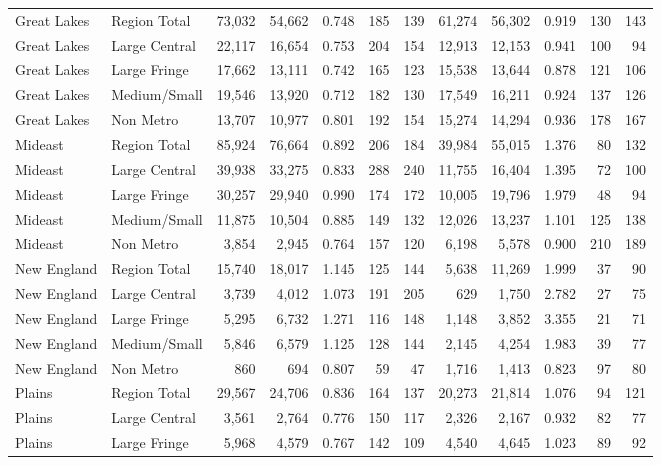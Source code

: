 \documentclass[
]{article}
\begin{document}
\begin{table}
\begin{tabular}[t]{llrrrrrrrrrr}
\addlinespace[5pt]
Great Lakes & Region Total & 73,032 & 54,662 & 0.748 & 185 & 139 & 61,274 & 56,302 & 0.919 & 130 & 143\\
\addlinespace[2pt]
Great Lakes & Large Central & 22,117 & 16,654 & 0.753 & 204 & 154 & 12,913 & 12,153 & 0.941 & 100 & 94\\
Great Lakes & Large Fringe & 17,662 & 13,111 & 0.742 & 165 & 123 & 15,538 & 13,644 & 0.878 & 121 & 106\\
Great Lakes & Medium/Small & 19,546 & 13,920 & 0.712 & 182 & 130 & 17,549 & 16,211 & 0.924 & 137 & 126\\
Great Lakes & Non Metro & 13,707 & 10,977 & 0.801 & 192 & 154 & 15,274 & 14,294 & 0.936 & 178 & 167\\
\addlinespace[5pt]
Mideast & Region Total & 85,924 & 76,664 & 0.892 & 206 & 184 & 39,984 & 55,015 & 1.376 & 80 & 132\\
\addlinespace[2pt]
Mideast & Large Central & 39,938 & 33,275 & 0.833 & 288 & 240 & 11,755 & 16,404 & 1.395 & 72 & 100\\
Mideast & Large Fringe & 30,257 & 29,940 & 0.990 & 174 & 172 & 10,005 & 19,796 & 1.979 & 48 & 94\\
Mideast & Medium/Small & 11,875 & 10,504 & 0.885 & 149 & 132 & 12,026 & 13,237 & 1.101 & 125 & 138\\
Mideast & Non Metro & 3,854 & 2,945 & 0.764 & 157 & 120 & 6,198 & 5,578 & 0.900 & 210 & 189\\
\addlinespace[5pt]
New England & Region Total & 15,740 & 18,017 & 1.145 & 125 & 144 & 5,638 & 11,269 & 1.999 & 37 & 90\\
\addlinespace[2pt]
New England & Large Central & 3,739 & 4,012 & 1.073 & 191 & 205 & 629 & 1,750 & 2.782 & 27 & 75\\
New England & Large Fringe & 5,295 & 6,732 & 1.271 & 116 & 148 & 1,148 & 3,852 & 3.355 & 21 & 71\\
New England & Medium/Small & 5,846 & 6,579 & 1.125 & 128 & 144 & 2,145 & 4,254 & 1.983 & 39 & 77\\
New England & Non Metro & 860 & 694 & 0.807 & 59 & 47 & 1,716 & 1,413 & 0.823 & 97 & 80\\
\addlinespace[5pt]
Plains & Region Total & 29,567 & 24,706 & 0.836 & 164 & 137 & 20,273 & 21,814 & 1.076 & 94 & 121\\
\addlinespace[2pt]
Plains & Large Central & 3,561 & 2,764 & 0.776 & 150 & 117 & 2,326 & 2,167 & 0.932 & 82 & 77\\
Plains & Large Fringe & 5,968 & 4,579 & 0.767 & 142 & 109 & 4,540 & 4,645 & 1.023 & 89 & 92\\

\end{tabular}
\end{table}
\end{document}
